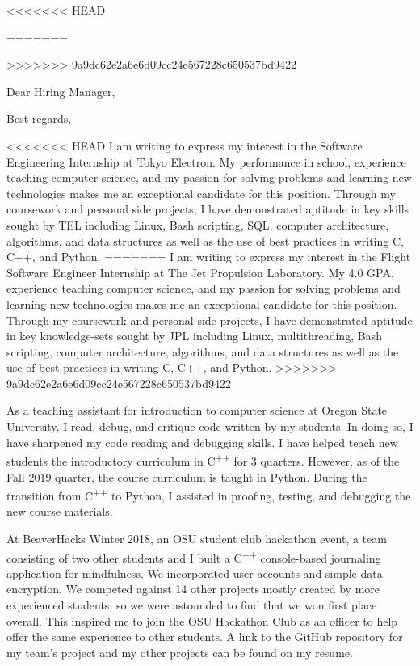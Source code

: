 \documentclass[11pt,a4paper,roman]{moderncv}        %
\begin{document}
<<<<<<< HEAD
\date{October 30, 2019}
=======
\date{November 8, 2019}
>>>>>>> 9a9dc62e2a6e6d09cc24e567228c650537bd9422
\opening{Dear Hiring Manager,}
\closing{Best regards,}
\makelettertitle

<<<<<<< HEAD
I am writing to express my interest in the Software Engineering Internship at Tokyo Electron. My performance in school, experience teaching computer science, and my passion for solving problems and learning new technologies makes me an exceptional candidate for this position. Through my coursework and personal side projects, I have demonstrated aptitude in key skills sought by TEL including Linux, Bash scripting, SQL, computer architecture, algorithms, and data structures as well as the use of best practices in writing C, C++, and Python.
=======
I am writing to express my interest in the Flight Software Engineer Internship at The Jet Propulsion Laboratory. My 4.0 GPA, experience teaching computer science, and my passion for solving problems and learning new technologies makes me an exceptional candidate for this position. Through my coursework and personal side projects, I have demonstrated aptitude in key knowledge-sets sought by JPL including Linux, multithreading, Bash scripting, computer architecture, algorithms, and data structures as well as the use of best practices in writing C, C++, and Python. 
>>>>>>> 9a9dc62e2a6e6d09cc24e567228c650537bd9422
 
As a teaching assistant for introduction to computer science at Oregon State University, I read, debug, and critique code written by my students. In doing so, I have sharpened my code reading and debugging skills. I have helped teach new students the introductory curriculum in C\textsuperscript{++} for 3 quarters. However, as of the Fall 2019 quarter, the course curriculum is taught in Python. During the transition from C\textsuperscript{++} to Python, I assisted in proofing, testing, and debugging the new course materials.
 
At BeaverHacks Winter 2018, an OSU student club hackathon event, a team consisting of two other students and I built a C\textsuperscript{++} console-based journaling application for mindfulness. We incorporated user accounts and simple data encryption. We competed against 14 other projects mostly created by more experienced students, so we were astounded to find that we won first place overall. This inspired me to join the OSU Hackathon Club as an officer to help offer the same experience to other students. A link to the GitHub repository for my team's project and my other projects can be found on my resume.
\end{document}
